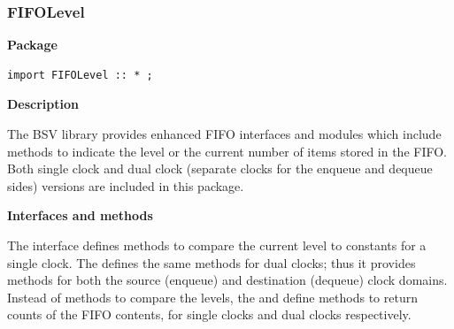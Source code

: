 \subsubsection{FIFOLevel}

\label{FIFOLevel}

{\bf Package}


\begin{verbatim}
import FIFOLevel :: * ;
\end{verbatim}

{\bf Description}

The BSV  library provides enhanced FIFO interfaces and modules
which include methods to indicate the level or the current number
of items stored in the FIFO.   Both single clock and dual clock
(separate clocks for the enqueue and dequeue sides)
versions are  included in this package. 


{\bf Interfaces and methods}

The  interface defines methods to compare the current
level to  constants for a single clock.  The
 defines the same methods for dual clocks; thus
it provides methods for both the source (enqueue) and destination
(dequeue) clock domains.  Instead of methods to compare the levels,
the  and  define methods to
return  counts of the FIFO contents, for single clocks and dual clocks
respectively. 






